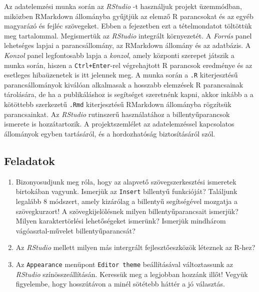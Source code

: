 \documentclass[
]{book}
\makeatletter
\providecommand{\tightlist}{%
  \setlength{\itemsep}{0pt}\setlength{\parskip}{0pt}}
\newenvironment{kframe}{%
\medskip{}
\setlength{\fboxsep}{.8em}
 \def\at@end@of@kframe{}%
 \ifinner\ifhmode%
  \def\at@end@of@kframe{\end{minipage}}%
  \begin{minipage}{\columnwidth}%
 \fi\fi%
 \def\FrameCommand##1{\hskip\@totalleftmargin \hskip-\fboxsep
 \colorbox{shadecolor}{##1}\hskip-\fboxsep
     \hskip-\linewidth \hskip-\@totalleftmargin \hskip\columnwidth}%
 \MakeFramed {\advance\hsize-\width
   \@totalleftmargin\z@ \linewidth\hsize
   \@setminipage}}%
 {\par\unskip\endMakeFramed%
 \at@end@of@kframe}
\newenvironment{rmdblock}[1]
  {
  \begin{itemize}
  \renewcommand{\labelitemi}{
    \raisebox{-.7\height}[0pt][0pt]{
      {\setkeys{Gin}{width=3em,keepaspectratio}\texttt{[image: images/\#1]}}
    }
  }
  \setlength{\fboxsep}{1em}
  \begin{kframe}
  \item
  }
  {
  \end{kframe}
  \end{itemize}
  }
\newenvironment{rmdsummary}
  {\begin{rmdblock}{summary}}
  {\end{rmdblock}}
\newenvironment{rmdexercise}
  {\begin{rmdblock}{exercise}}
  {\end{rmdblock}}
\makeatother
\begin{document}
\begin{rmdsummary}
Az adatelemzési munka során az \emph{RStudio} -t használjuk projekt
üzemmódban, miközben RMarkdown állományba gyűjtjük az elemző R
parancsokat és az egyéb magyarázó és fejléc szövegeket. Ebben a
fejezetben ezt a tételmondatot töltöttük meg tartalommal. Megismertük az
\emph{RStudio} integrált környezetét. A \emph{Forrás} panel lehetséges
lapjai a parancsállomány, az RMarkdown állomány és az adatbázis. A
\emph{Konzol} panel legfontosabb lapja a \emph{konzol}, amely központi
szerepet játszik a munka során, hiszen a \texttt{Ctrl+Enter}-rel
végrehajtott R parancsok eredménye és az esetleges hibaüzenetek is itt
jelennek meg. A munka során a \texttt{.R} kiterjesztésű
parancsállományok kiválóan alkalmasak a hosszabb elemzések R
parancsainak tárolására, de ha a publikáláshoz is segítséget szeretnénk
kapni, akkor inkább a a kötöttebb szerkezetű \texttt{.Rmd} kiterjesztésű
RMarkdown állományba rögzítsük parancsainkat. Az \emph{RStudio}
rutinszerű használatához a billentyűparancsok ismerete is hozzátartozik.
A projektszemlélet az adatelemzéssel kapcsolatos állományok egyben
tartásáról, és a hordozhatóság biztosításáról szól.
\end{rmdsummary}

\hypertarget{munka-az-r-ben-1-exercise}{%
\subsection{Feladatok}\label{munka-az-r-ben-1-exercise}}

\begin{rmdexercise}
\begin{enumerate}
\def\labelenumi{\arabic{enumi}.}
\tightlist
\item
  Bizonyosudjunk meg róla, hogy az alapvető szövegszerkesztési ismeretek birtokában vagyunk. Ismerjük az \texttt{Insert} billentyű funkcióját? Találjunk legalább 8 módszert, amely kizárólag a billentyű segítségével mozgatja a szövegkurzort! A szövegkijelölésnek milyen billentyűparancsait ismerjük? Milyen karaktertörlési lehetőségeket ismerünk? Ismerjük mindhárom vágóasztal-művelet billentyűparancsát?
\item
  Az \emph{RStudio} mellett milyen más intergrált fejlesztőeszközök léteznek az R-hez?
\item
  Az \texttt{Appearance} menüpont \texttt{Editor\ theme} beállításával változtassunk az \emph{RStudio} színösszeállításán. Keressük meg a legjobban hozzánk illőt! Vegyük figyelembe, hogy hosszútávon a minél sötétebb háttér a jó választás.
\end{enumerate}
\end{rmdexercise}
\end{document}
